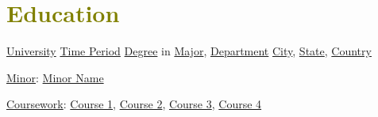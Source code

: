 

\section{\textcolor{olive}{\textbf{Education}}}
	\resumeSubHeadingListStart
		
    \resumeSubheading
        {\underline{University}}
        {\underline{Time Period}}
        {\underline{Degree} in \underline{Major}, \underline{Department}}
        {\textcolor{gray}{\footnotesize{\faMapMarker}} \underline{City}, \underline{State}, \underline{Country}}

    \resumeItemListStart
        \item {
            \underline{Minor}: \underline{Minor Name}
        }
        \item {
            \underline{Coursework}: \underline{Course 1}, \underline{Course 2}, \underline{Course 3}, \underline{Course 4}
        }
    \resumeItemListEnd
		  
	\resumeSubHeadingListEnd
